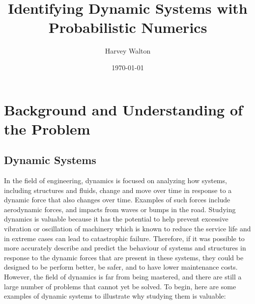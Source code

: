 \documentclass[12pt]{article}
\title{Identifying Dynamic Systems with Probabilistic Numerics}
\author{Harvey Walton}
\date{\today}
\begin{document}

    \thispagestyle{empty}
    

    \printnomenclature

    \newpage
    \tableofcontents
    \newpage


    \section{Background and Understanding of the Problem}

    \subsection{Dynamic Systems}
    In the field of engineering, dynamics is focused on analyzing how systems, including structures and fluids, change and move over time in response to a dynamic force that also changes over time.
    Examples of such forces include aerodynamic forces, and impacts from waves or bumps in the road.
    Studying dynamics is valuable because it has the potential to help prevent excessive vibration or oscillation of machinery which is known to reduce the service life and in extreme cases can lead to catastrophic failure.
    Therefore, if it was possible to more accurately describe and predict the behaviour of systems and structures in response to the dynamic forces that are present in these systems, they could be designed to be perform better, be safer, and to have lower maintenance costs.
    However, the field of dynamics is far from being mastered, and there are still a large number of problems that cannot yet be solved.
    To begin, here are some examples of dynamic systems to illustrate why studying them is valuable:
\end{document}
